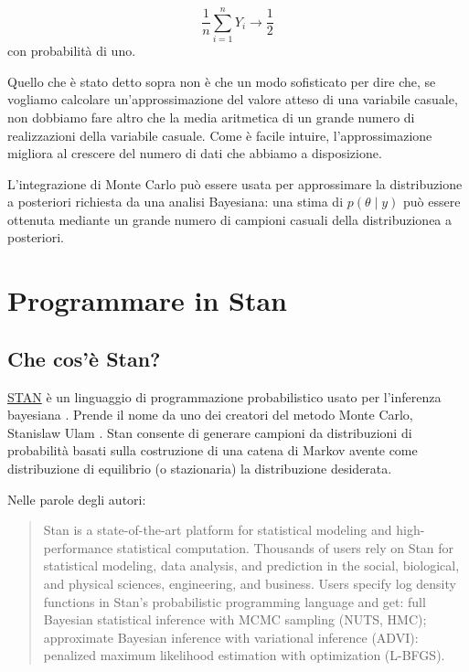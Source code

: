 \documentclass[
]{memoir}
\begin{document}
\[
  \frac{1}{n} \sum_{i=1}^n Y_i \rightarrow \frac{1}{2}
\]
con probabilità di uno.

Quello che è stato detto sopra non è che un modo sofisticato per dire che, se vogliamo calcolare un'approssimazione del valore atteso di una variabile casuale, non dobbiamo fare altro che la media aritmetica di un grande numero di realizzazioni della variabile casuale. Come è facile intuire, l'approssimazione migliora al crescere del numero di dati che abbiamo a disposizione.

L'integrazione di Monte Carlo può essere usata per approssimare la distribuzione a posteriori richiesta da una analisi Bayesiana: una stima di \(p(\theta \mid y)\) può essere ottenuta mediante un grande numero di campioni casuali della distribuzionea a posteriori.

\hypertarget{intro-stan}{%
\chapter{Programmare in Stan}\label{intro-stan}}

\hypertarget{che-cosuxe8-stan}{%
\section{Che cos'è Stan?}\label{che-cosuxe8-stan}}

\href{http://mc-stan.org/}{STAN} è un linguaggio di programmazione probabilistico usato per l'inferenza bayesiana \citep{carpenter2017stan}. Prende il nome da uno dei creatori del metodo Monte Carlo, Stanislaw Ulam \citep{Eckhardt1987stan}. Stan consente di generare campioni da distribuzioni di probabilità basati sulla costruzione di una catena di Markov avente come distribuzione di equilibrio (o stazionaria) la distribuzione desiderata.

Nelle parole degli autori:

\begin{quote}
Stan is a state-of-the-art platform for statistical modeling and high-performance statistical computation. Thousands of users rely on Stan for statistical modeling, data analysis, and prediction in the social, biological, and physical sciences, engineering, and business. Users specify log density functions in Stan's probabilistic programming language and get: full Bayesian statistical inference with MCMC sampling (NUTS, HMC); approximate Bayesian inference with variational inference (ADVI): penalized maximum likelihood estimation with optimization (L-BFGS).
\end{quote}
\end{document}
